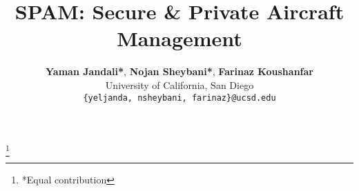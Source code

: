 \documentclass[9pt,sigconf,screen]{acmart}
\begin{document}
\title{\textbf{SPAM}: Secure \& Private Aircraft Management}




\author{\textbf{Yaman Jandali*}, \textbf{Nojan Sheybani*}, \textbf{Farinaz Koushanfar} \\ 
University of California, San Diego \\ 
\tt\small{\{yeljanda, nsheybani, farinaz\}@ucsd.edu}}
\thanks{*Equal contribution}

\renewcommand{\shortauthors}{Jandali, Sheybani, and Koushanfar}
\end{document}

